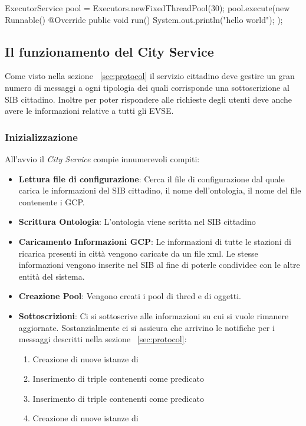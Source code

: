 \begin{java}[caption={Creazione Pool di Thread},label={lst:threadPool}]
ExecutorService pool = Executors.newFixedThreadPool(30);
pool.execute(new Runnable() {
	@Override
	public void run() {
		System.out.println("hello world");
	}
});
\end{java}

\subsection{Il funzionamento del City Service}
 
Come visto nella sezione ~\ref{sec:protocol} il servizio cittadino deve gestire un gran numero di messaggi a ogni tipologia dei quali corrisponde una sottoscrizione al SIB cittadino. Inoltre per poter rispondere alle richieste degli utenti deve anche avere le informazioni relative a tutti gli EVSE.

\subsubsection{Inizializzazione}

All'avvio il \emph{City Service} compie innumerevoli compiti:

\begin{itemize}
	\item \textbf{Lettura file di configurazione}: Cerca il file di configurazione  dal quale carica le informazioni del SIB cittadino, il nome dell'ontologia, il nome del file contenente i GCP.
	\item \textbf{Scrittura Ontologia}: L'ontologia viene scritta nel SIB cittadino
	\item \textbf{Caricamento Informazioni GCP}: Le informazioni di tutte le stazioni di ricarica presenti in città vengono caricate da un file xml. Le stesse informazioni vengono inserite nel SIB al fine di poterle condividee con le altre entità del sistema.
	\item \textbf{Creazione Pool}: Vengono creati i pool di thred e di oggetti.
	\item \label{item:subscr} \textbf{Sottoscrizioni}: Ci si sottoscrive alle informazioni su cui si vuole rimanere aggiornate. Sostanzialmente ci si assicura che arrivino le notifiche per i messaggi descritti nella sezione ~\ref{sec:protocol}:
	\begin{enumerate}
		\item Creazione di nuove istanze di 
		\item Inserimento di triple contenenti come predicato 
		\item Inserimento di triple contenenti come predicato 
		\item Creazione di nuove istanze di 
	\end{enumerate}
\end{itemize}

